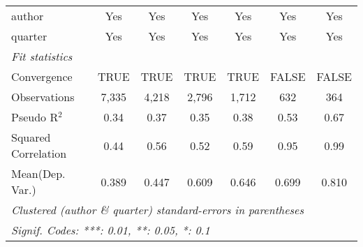 \begin{tabular}{lcccccc}
   author                                                     & Yes           & Yes           & Yes          & Yes           & Yes           & Yes\\  
   quarter                                                    & Yes           & Yes           & Yes          & Yes           & Yes           & Yes\\  
   \midrule
   \emph{Fit statistics}\\
   Convergence                                                &TRUE           & TRUE          & TRUE         & TRUE          & FALSE         & FALSE\\  
   Observations                                               & 7,335         & 4,218         & 2,796        & 1,712         & 632           & 364\\  
   Pseudo R$^2$                                               & 0.34          & 0.37          & 0.35         & 0.38          & 0.53          & 0.67\\  
   Squared Correlation                                        & 0.44          & 0.56          & 0.52         & 0.59          & 0.95          & 0.99\\  
Mean(Dep. Var.) & 0.389 & 0.447 & 0.609 & 0.646 & 0.699 & 0.810 \\
   \midrule \midrule
   \multicolumn{7}{l}{\emph{Clustered (author \& quarter) standard-errors in parentheses}}\\
   \multicolumn{7}{l}{\emph{Signif. Codes: ***: 0.01, **: 0.05, *: 0.1}}\\
\end{tabular}
\par\endgroup
